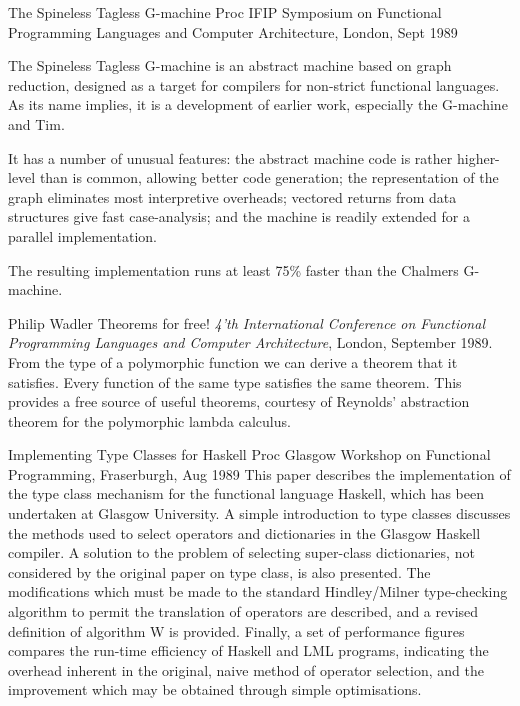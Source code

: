 

{The Spineless Tagless G-machine}
{Proc IFIP Symposium on Functional Programming Languages and Computer
Architecture, London, Sept 1989}
{
The Spineless Tagless G-machine is an abstract machine based on graph
reduction, designed as a target for compilers for non-strict functional
languages.
As its name implies, it is a development of earlier work, especially
the G-machine and Tim.

It has a number of unusual features: the abstract machine code is
rather higher-level than is common, allowing better code generation;
the representation of the graph eliminates most interpretive overheads;
vectored returns from data structures give fast case-analysis;
and the machine is readily extended for a parallel implementation.

The resulting implementation runs at least 75\% faster 
than the Chalmers G-machine.
}

{Philip Wadler}
{Theorems for free!}
{{\em 4'th International Conference on Functional Programming
Languages and Computer Architecture}, London, September 1989.}
{
From the type of a polymorphic function we can derive a theorem
that it satisfies.  Every function of the same type satisfies the same
theorem.  This provides a free source of useful theorems,
courtesy of Reynolds' abstraction theorem for the polymorphic lambda
calculus.
}


{Implementing Type Classes for Haskell}
{Proc Glasgow  Workshop  on  Functional  Programming,  Fraserburgh, Aug 1989}
{
This  paper describes the implementation of the type class mechanism for
the functional language Haskell, which has been  undertaken  at  Glasgow
University.  A simple introduction to type classes discusses the methods
used to  select  operators  and  dictionaries  in  the  Glasgow  Haskell
compiler.    A   solution   to  the  problem  of  selecting  super-class
dictionaries, not considered by the original paper  on  type  class,  is
also  presented.   The  modifications which must be made to the standard
Hindley/Milner type-checking algorithm  to  permit  the  translation  of
operators  are  described,  and  a  revised definition of algorithm W is
provided. Finally, a set of performance figures  compares  the  run-time
efficiency of Haskell and LML programs, indicating the overhead inherent
in the original, naive method of operator selection, and the improvement
which may be obtained through simple optimisations.
}

